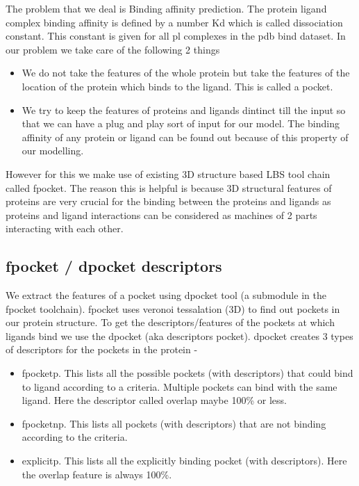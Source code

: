 \documentclass[11pt]{article}
\begin{document}
The problem that we deal is Binding affinity prediction. 
The protein ligand complex binding affinity is defined by a number Kd which is called dissociation constant.
This constant is given for all pl complexes in the pdb bind dataset.
In our problem we take care of the following 2 things
\begin{itemize}
\item We do not take the features of the whole protein
but take the features of the location of the protein which binds to the ligand.
This is called a pocket.
\item We try to keep the features of proteins and ligands dintinct till the input so that we can have a plug and play sort of input for our model.
The binding affinity of any protein or ligand can be found out because of this property of our modelling.
\end{itemize}

However for this we make use of existing 3D structure based LBS tool chain called fpocket.
The reason this is helpful is because 3D structural features of proteins are very crucial for the binding between 
the proteins and ligands as proteins and ligand interactions can be considered as
machines of 2 parts interacting with each other.

\subsection{fpocket / dpocket descriptors}
We extract the features of a pocket using dpocket tool (a submodule in the fpocket toolchain).
fpocket uses veronoi tessalation (3D) to find out pockets in our protein structure.
To get the descriptors/features of the pockets at which ligands bind we use the dpocket (aka descriptors pocket).
dpocket creates 3 types of descriptors for the pockets in the protein -
\begin{itemize}
\item fpocketp.  This lists all the possible pockets (with descriptors) that could bind to ligand according to a criteria.
Multiple pockets can bind with the same ligand.
Here the descriptor called overlap maybe 100\% or less.
\item fpocketnp.  This lists all pockets (with descriptors) that are not binding according to the criteria.
\item explicitp.
This lists all the explicitly binding pocket (with descriptors).
Here the overlap feature is always 100\%.
\end{itemize}
\end{document}
